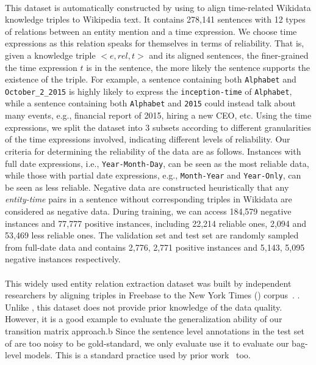 \paragraph{\TimeRE}
This dataset is automatically constructed by using \DS to align time-related Wikidata knowledge triples to
Wikipedia text.  It contains 278,141 sentences with 12
types of relations  between an entity mention and a time expression.
We choose time expressions as this relation speaks for themselves in
terms of reliability. That is, given a knowledge triple $<$$e,rel,t$$>$ and its
aligned sentences,  the  finer-grained the time expression $t$ is in the sentence,
the more likely the sentence  supports the existence of the triple.
For example, a sentence containing both \texttt{Alphabet} and \texttt{October\_2\_2015} is highly likely to express the \texttt{inception-time} of \texttt{Alphabet}, while a sentence containing both \texttt{Alphabet} and \texttt{2015} could instead talk  about many events, e.g.,  financial report of 2015, hiring a new CEO, etc.
Using the time expressions, we split the dataset into
3 subsets according to different granularities of the time expressions involved, indicating different levels of reliability.
Our criteria for determining the reliability of the data are as follows.
Instances with full date expressions, i.e., \texttt{Year-Month-Day}, can be seen as the most reliable data, while those with
partial date expressions, e.g., \texttt{Month-Year} and \texttt{Year-Only}, can be seen as less
reliable.  Negative data are constructed  heuristically that any
\emph{entity-time} pairs in a sentence without corresponding triples in Wikidata are considered as negative data.  
During training, we can access  184,579 negative
instances and  77,777 positive instances, including 22,214 reliable
ones, 2,094 and 53,469 less reliable ones. The validation set and test set are randomly sampled from full-date data and contains
2,776, 2,771 positive instances and 5,143, 5,095 negative instances respectively.  


\paragraph{\EntityRE}
This widely used entity
relation extraction dataset was built by independent researchers by aligning triples
in Freebase to the New York Times (\NYT) corpus~\cite{riedel2010modeling}. .
Unlike \TimeRE, this dataset does not provide prior knowledge of the data quality.
However, it is a good example to evaluate the generalization
ability of our transition matrix approach.b
Since the sentence level annotations in the test set of \EntityRE are too noisy to be gold-standard,  we only evaluate use it to
evaluate our bag-level models. This is a standard practice used by prior work~\todo{\cite{}} too.


